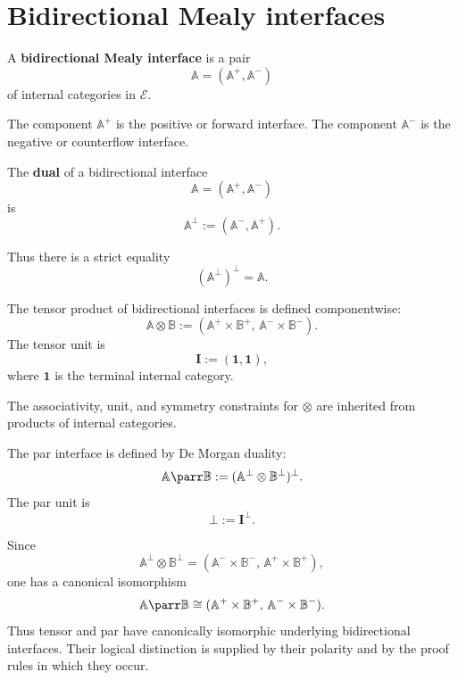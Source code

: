 \section{Bidirectional Mealy interfaces}
\label{sec:bidirectional-mealy-interfaces}

\begin{definition}
\label{def:bidirectional-mealy-interface}
A \textbf{bidirectional Mealy interface} is a pair
\[
\mathbb A=(\mathbb A^+,\mathbb A^-)
\]
of internal categories in \(\mathcal E\).
\end{definition}

The component \(\mathbb A^+\) is the positive or forward interface.  The
component \(\mathbb A^-\) is the negative or counterflow interface.

\begin{definition}
\label{def:bidirectional-dual-interface}
The \textbf{dual} of a bidirectional interface
\[
\mathbb A=(\mathbb A^+,\mathbb A^-)
\]
is
\[
\mathbb A^\bot:=(\mathbb A^-,\mathbb A^+).
\]
\end{definition}

Thus there is a strict equality
\[
(\mathbb A^\bot)^\bot=\mathbb A.
\]

\begin{definition}
\label{def:tensor-bidirectional-interfaces}
The tensor product of bidirectional interfaces is defined componentwise:
\[
\mathbb A\otimes\mathbb B
:=
(\mathbb A^+\times\mathbb B^+,\,
 \mathbb A^-\times\mathbb B^-).
\]
The tensor unit is
\[
\mathbf I:=(\mathbf 1,\mathbf 1),
\]
where \(\mathbf 1\) is the terminal internal category.
\end{definition}

The associativity, unit, and symmetry constraints for \(\otimes\) are inherited
from products of internal categories.

\begin{definition}
\label{def:par-bidirectional-interfaces}
The par interface is defined by De Morgan duality:
\[
\mathbb A\parr\mathbb B
:=
(\mathbb A^\bot\otimes\mathbb B^\bot)^\bot.
\]
The par unit is
\[
\bot:=\mathbf I^\bot.
\]
\end{definition}

Since
\[
\mathbb A^\bot\otimes\mathbb B^\bot
=
(\mathbb A^-\times\mathbb B^-,\,
 \mathbb A^+\times\mathbb B^+),
\]
one has a canonical isomorphism
\[
\mathbb A\parr\mathbb B
\cong
(\mathbb A^+\times\mathbb B^+,\,
 \mathbb A^-\times\mathbb B^-).
\]
Thus tensor and par have canonically isomorphic underlying bidirectional
interfaces.  Their logical distinction is supplied by their polarity and by
the proof rules in which they occur.

